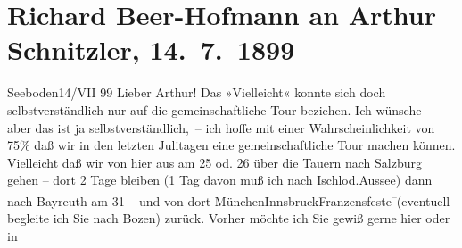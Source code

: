 

         
         \renewcommand{\erwaehntePersonen}{Personen: Gustav Schwarzkopf}
         \renewcommand{\erwaehnteOrte}{Orte: Bad Aussee, Bad Ischl, Bayreuth, Bozen, Franzensfeste, Hohe Tauern, Innsbruck, Millstatt, München, Salzburg, Seeboden, Velden am Wörthersee}
         \renewcommand{\erwaehnteWerke}{Werke: Der Tod Georgs}
               \section[Richard Beer-Hofmann an Arthur Schnitzler, 14. 7. 1899]{ Richard Beer-Hofmann an Arthur Schnitzler, 14. 7. 1899}\nopagebreak{}\rehead{ }\begin{ledgroupsized}[t]{13cm}\normalsize\beginnumbering \toendnotes[C]{\smallbreak\pagebreak[2]} 
\toendnotes[C]{\smallbreak}\pstart
           \centering{}{\pb}Seeboden14/VII 99\pend
           \pstart
           Lieber Arthur! Das »Vielleicht« konnte sich doch selbstverständlich
               nur auf die gemeinschaftliche Tour beziehen. Ich wünsche – aber das ist ja
               selbstverständlich, – ich hoffe mit einer Wahrscheinlichkeit von 75{\%} daß wir in den letzten Julitagen eine gemeinschaftliche
               Tour machen können. Vielleicht daß wir von hier aus {\pb}am 25 od.
                  26 über die Tauern nach Salzburg gehen – dort 2 Tage bleiben (1 Tag davon muß ich
               nach Ischl\introOben{}od.\introOben{}{ }Aussee) dann nach Bayreuth am 31 – und von dort MünchenInnsbruckFranzensfeste\substVorne{}\textsuperscript{–}\substDazwischen{}(\substHinten{}eventuell begleite ich Sie nach Bozen\introOben{})\introOben{} zurück. Vorher möchte ich Sie gewiß gerne hier oder in

\end{ledgroupsized}
